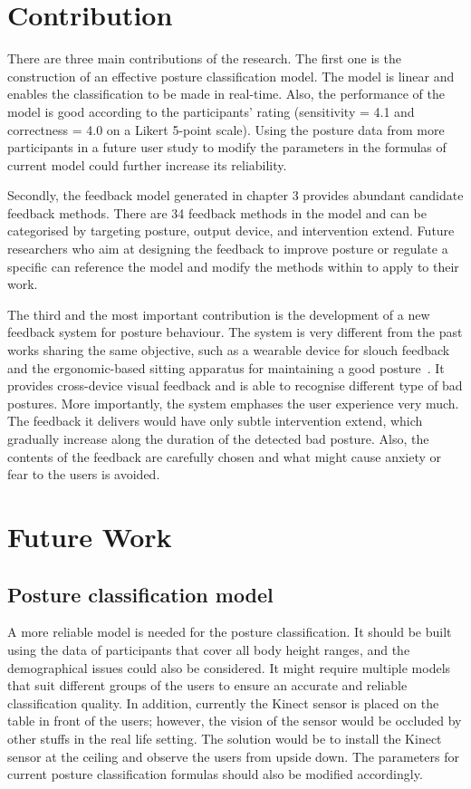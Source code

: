 \section{Contribution}
There are three main contributions of the research. The first one is the construction of an effective posture classification model. The model is linear and enables the classification to be made in real-time. Also, the performance of the model is good according to the participants’ rating (sensitivity = 4.1 and correctness = 4.0 on a Likert 5-point scale). Using the posture data from more participants in a future user study to modify the parameters in the formulas of current model could further increase its reliability.

Secondly, the feedback model generated in chapter 3 provides abundant candidate feedback methods. There are 34 feedback methods in the model and can be categorised by targeting posture, output device, and intervention extend. Future researchers who aim at designing the feedback to improve posture or regulate a specific can reference the model and modify the methods within to apply to their work.

The third and the most important contribution is the development of a new feedback system for posture behaviour. The system is very different from the past works sharing the same objective, such as a wearable device for slouch feedback~\cite{wearable_spinal_posture} and the ergonomic-based sitting apparatus for maintaining a good posture~\cite{monitor_support_apparatus}. It provides cross-device visual feedback and is able to recognise different type of bad postures. More importantly, the system emphases the user experience very much. The feedback it delivers would have only subtle intervention extend, which gradually increase along the duration of the detected bad posture. Also, the contents of the feedback are carefully chosen and what might cause anxiety or fear to the users is avoided.

\section{Future Work}
\subsection{Posture classification model}
A more reliable model is needed for the posture classification. It should be built using the data of participants that cover all body height ranges, and the demographical issues could also be considered. It might require multiple models that suit different groups of the users to ensure an accurate and reliable classification quality. In addition, currently the Kinect sensor is placed on the table in front of the users; however, the vision of the sensor would be occluded by other stuffs in the real life setting. The solution would be to install the Kinect sensor at the ceiling and observe the users from upside down. The parameters for current posture classification formulas should also be modified accordingly.

